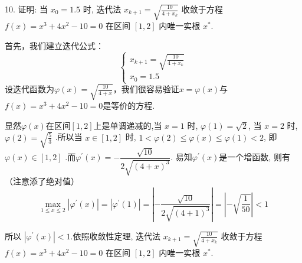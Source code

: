 \begin{tcolorbox}[breakable,enhanced,arc=0mm,outer arc=0mm,
		boxrule=0pt,toprule=1pt,leftrule=0pt,bottomrule=1pt, rightrule=0pt,left=0.2cm,right=0.2cm,
		titlerule=0.5em,toptitle=0.1cm,bottomtitle=-0.1cm,top=0.2cm,
		colframe=white!10!biru,colback=white!90!biru,coltitle=white,
            coltext=black,title =2024-04, title style={white!10!biru}, before skip=8pt, after skip=8pt,before upper=\hspace{2em},
		fonttitle=\bfseries,fontupper=\normalsize]
  
10. 证明: 当 $ x_{0}=1.5 $ 时, 迭代法 $ x_{k+1}=\sqrt{\frac{10}{4+x_{k}}} $ 收敛于方程 $ f(x)=x^{3}+4 x^{2}-10=0 $ 在区间 $ [1,2] $ 内唯一实根 $ x^{*} $.

\tcblower

首先，我们建立迭代公式：
$$
\left\{
\begin{array}{l}
x_{k+1}=\sqrt{\frac{10}{4+x_{k}}} \\
x_{0}=1.5
\end{array}
\right.
$$
设迭代函数为$\varphi(x)=\sqrt{\frac{10}{4+x}}$，我们很容易验证$x=\varphi(x)$与$f(x)=x^{3}+4x^{2}-10=0$是等价的方程.

显然$\varphi(x)$在区间$[1,2]$上是单调递减的,当 $ {x}=1 $ 时, $ \varphi(1)=\sqrt{2} $, 当 $ {x}=2 $ 时, $ \varphi(2)=\sqrt{\frac{5}{3}} $ .所以当 $ {x} \in[1,2] $ 时, $ 1<\varphi(2) \leqslant \varphi({x}) \leqslant \varphi(1)<2 $, 即 $ \varphi({x}) \in[1,2] $ .而$ \varphi ^{\prime}(x)=-\dfrac{\sqrt{10}}{2\sqrt{(4+x)^{3}}}$.
易知$ \varphi ^{\prime}(x)$是一个增函数, 则有（注意添了绝对值）
$$
\max _{1 \leqslant x \leqslant 2}\left|\varphi^{\prime}(x)\right|=|\varphi^{\prime}(1)|=\left|- \frac{\sqrt{10}}{2\sqrt{(4+1)^{3}}}\right|=\left|-\sqrt{\frac{1}{50}}\right|<1
$$

 所以 $|\varphi^{\prime}({x})|<1 $.依照收敛性定理, 迭代法 $ {x}_{{k}+1}=\sqrt{\frac{10}{4+{x}_{{k}}}} $ 收敛于方程 $ f(x)=x^{3}+4 x^{2}-10=0 $ 在区间 $ [1,2] $ 内唯一实根 $ x^{*} $.
\end{tcolorbox}


